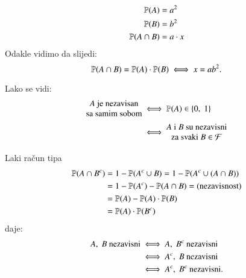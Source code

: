 \begin{pr}
\begin{figure}[H]
\begin{subfigure}[b]{0.45\textwidth}
        \end{subfigure}
    \end{figure}
    \begin{equation*}
        \begin{aligned}
            \mathbb{P}({A}) &= a^2\\
            \mathbb{P}({B}) &= b^2\\
            \mathbb{P}({A \cap B}) &= a \cdot x
        \end{aligned}
    \end{equation*}
    Odakle vidimo da slijedi:
    \begin{equation*}
        \mathbb{P}({A \cap B}) = \mathbb{P}({A}) \cdot \mathbb{P}({B}) \iff x = a b^2.
    \end{equation*}
\end{pr}

Lako se vidi:\\
\begin{align}   \label{jed:6.2}
    \begin{split}
        \begin{matrix}
            A \textnormal{ je nezavisan}\\
            \textnormal{sa samim sobom}
        \end{matrix}
        &\iff
        \mathbb{P}({A}) \in \{0, \; 1\}\\
        &\iff
        \begin{matrix}
            \textnormal{$A$ i $B$ su nezavisni}\\
            \textnormal{za svaki } B \in \mathcal{F}
        \end{matrix}
    \end{split}
\end{align}

Laki ra\v cun tipa
\begin{align*}
    \mathbb{P}({A \cap B^c}) &= 1 - \mathbb{P}({A^c \cup B}) = 1 - \mathbb{P}({A^c \cup (A \cap B)})\\
    &= 1 - \mathbb{P}({A^c}) - \mathbb{P}({A \cap B}) = (\textnormal{nezavisnost})\\
    &= \mathbb{P}({A}) - \mathbb{P}({A}) \cdot \mathbb{P}({B})\\
    &= \mathbb{P}({A}) \cdot \mathbb{P}({B^c})
\end{align*}
daje:
\begin{align}   \label{jed:6.3}
    \begin{split}
        A, \; B \textnormal{ nezavisni} &\iff A, \; B^c \textnormal{ nezavisni}\\
        &\iff A^c, \; B \textnormal{ nezavisni}\\
        &\iff A^c, \; B^c \textnormal{ nezavisni}.
    \end{split}
\end{align}


